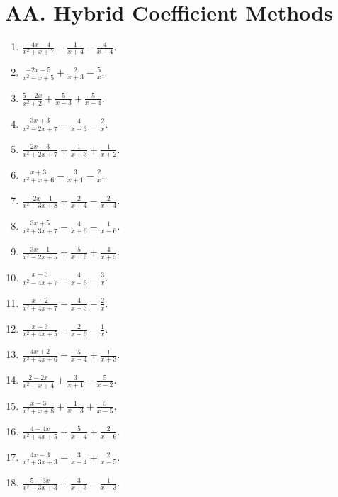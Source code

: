 \documentclass[11pt,oneside]{book}
\begin{document}
\section*{AA. Hybrid Coefficient Methods}
\begin{enumerate}[leftmargin=*,label=\textbf{AA\arabic*.},itemsep=0.45\baselineskip]
\item $\displaystyle \frac{- 4 x - 4}{x^{2} + x + 7} - \frac{1}{x + 4} - \frac{4}{x - 4}$.
\item $\displaystyle \frac{- 2 x - 5}{x^{2} - x + 5} + \frac{2}{x + 3} - \frac{5}{x}$.
\item $\displaystyle \frac{5 - 2 x}{x^{2} + 2} + \frac{5}{x - 3} + \frac{5}{x - 4}$.
\item $\displaystyle \frac{3 x + 3}{x^{2} - 2 x + 7} - \frac{4}{x - 3} - \frac{2}{x}$.
\item $\displaystyle \frac{2 x - 3}{x^{2} + 2 x + 7} + \frac{1}{x + 3} + \frac{1}{x + 2}$.
\item $\displaystyle \frac{x + 3}{x^{2} + x + 6} - \frac{3}{x + 1} - \frac{2}{x}$.
\item $\displaystyle \frac{- 2 x - 1}{x^{2} - 3 x + 8} + \frac{2}{x + 4} - \frac{2}{x - 4}$.
\item $\displaystyle \frac{3 x + 5}{x^{2} + 3 x + 7} - \frac{4}{x + 6} - \frac{1}{x - 6}$.
\item $\displaystyle \frac{3 x - 1}{x^{2} - 2 x + 5} + \frac{5}{x + 6} + \frac{4}{x + 5}$.
\item $\displaystyle \frac{x + 3}{x^{2} - 4 x + 7} - \frac{4}{x - 6} - \frac{3}{x}$.
\item $\displaystyle \frac{x + 2}{x^{2} + 4 x + 7} - \frac{4}{x + 3} - \frac{2}{x}$.
\item $\displaystyle \frac{x - 3}{x^{2} + 4 x + 5} - \frac{2}{x - 6} - \frac{1}{x}$.
\item $\displaystyle \frac{4 x + 2}{x^{2} + 4 x + 6} - \frac{5}{x + 4} + \frac{1}{x + 3}$.
\item $\displaystyle \frac{2 - 2 x}{x^{2} - x + 4} + \frac{3}{x + 1} - \frac{5}{x - 2}$.
\item $\displaystyle \frac{x - 3}{x^{2} + x + 8} + \frac{1}{x - 3} + \frac{5}{x - 5}$.
\item $\displaystyle \frac{4 - 4 x}{x^{2} + 4 x + 5} + \frac{5}{x - 4} + \frac{2}{x - 6}$.
\item $\displaystyle \frac{4 x - 3}{x^{2} + 3 x + 3} - \frac{3}{x - 4} + \frac{2}{x - 5}$.
\item $\displaystyle \frac{5 - 3 x}{x^{2} - 3 x + 3} + \frac{3}{x + 3} - \frac{1}{x - 3}$.

\end{enumerate}
\end{document}
